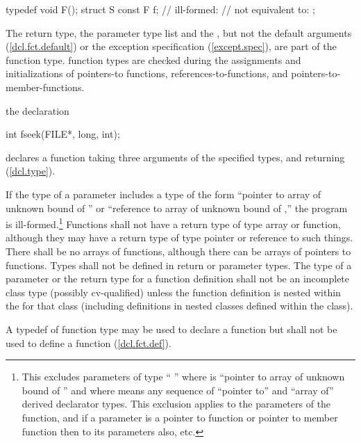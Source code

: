 \begin{codeblock}
typedef void F();
struct S {
	const F f;		// ill-formed:
				// not equivalent to: 
};
\end{codeblock}
\exitexampleb
The return type, the parameter type list and the
,
but not the default arguments (\ref{dcl.fct.default})
or the exception specification (\ref{except.spec}),
are part of the function type.
\enternote
function types are checked during the assignments and initializations of
pointers-to functions, references-to-functions, and pointers-to-member-functions.
\exitnote

\pnum
\enterexample
{}%
the declaration

\begin{codeblock}
int fseek(FILE*, long, int);
\end{codeblock}

declares a function taking three arguments of the specified types,
and returning
(\ref{dcl.type}).
\exitexample

\pnum
If the type of a parameter includes a type of the form
``pointer to array of unknown bound of '' or
``reference to array of unknown bound of ,''
the program is ill-formed.\footnote{This excludes parameters of type
`` '' where  is
``pointer to array of unknown bound of '' and where
 means any sequence of ``pointer to'' and
``array of'' derived declarator types.
This exclusion applies to the parameters of the function,
and if a parameter is a pointer to function
or pointer to member function then to its
parameters also, etc.
}
%
%
Functions shall not have a return type of type array or function,
although they may have a return type of type pointer or reference to such things.
There shall be no arrays of functions, although there can be arrays of pointers
to functions.
Types shall not be defined in return or parameter types.
The type of a parameter or the return type for a function
definition shall not be an incomplete class type (possibly
cv-qualified) unless the function definition is nested
within the
for that class (including definitions in nested classes
defined within the class).

\pnum
{}%
A typedef of function type may be used to declare a function but shall not be
used to define a function (\ref{dcl.fct.def}).
\enterexample

